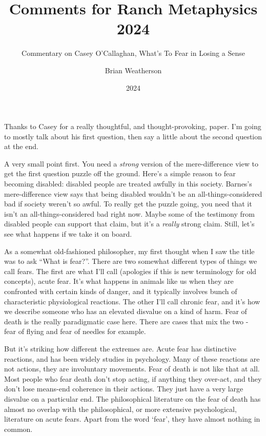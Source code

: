 \documentclass[
  11pt,
  letterpaper,
  DIV=11,
  numbers=noendperiod,
  oneside]{scrartcl}
\title{Comments for Ranch Metaphysics 2024}
\subtitle{Commentary on Casey O'Callaghan, What's To Fear in Losing a
Sense}
\author{Brian Weatherson}
\date{2024}
\begin{document}
\maketitle

Thanks to Casey for a really thoughtful, and thought-provoking, paper.
I'm going to mostly talk about his first question, then say a little
about the second question at the end.

A very small point first. You need a \emph{strong} version of the
mere-difference view to get the first question puzzle off the ground.
Here's a simple reason to fear becoming disabled: disabled people are
treated awfully in this society. Barnes's mere-difference view says that
being disabled wouldn't be an all-things-considered bad if society
weren't so awful. To really get the puzzle going, you need that it isn't
an all-things-considered bad right now. Maybe some of the testimony from
disabled people can support that claim, but it's a \emph{really} strong
claim. Still, let's see what happens if we take it on board.

As a somewhat old-fashioned philosopher, my first thought when I saw the
title was to ask ``What is fear?''. There are two somewhat different
types of things we call fears. The first are what I'll call (apologies
if this is new terminology for old concepts), acute fear. It's what
happens in animals like us when they are confronted with certain kinds
of danger, and it typically involves bunch of characteristic
physiological reactions. The other I'll call chronic fear, and
it's how we describe someone who has an elevated disvalue on a kind of
harm. Fear of death is the really paradigmatic case here. There are cases that mix the two - fear of
flying and fear of needles for example.

But it's striking how different the extremes are. Acute fear has
distinctive reactions, and has been widely studies in psychology. Many
of these reactions are not actions, they are involuntary movements. Fear
of death is not like that at all. Most people who fear death don't stop
acting, if anything they over-act, and they don't lose means-end
coherence in their actions. They just have a very large disvalue on a
particular end. The philosophical literature on the fear of death has
almost no overlap with the philosophical, or more extensive
psychological, literature on acute fears. Apart from the word `fear',
they have almost nothing in common.
\end{document}
